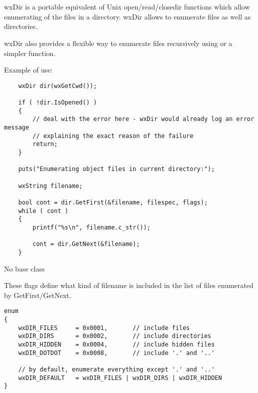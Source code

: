 
\section{}\label{wxdir}

wxDir is a portable equivalent of Unix {open/read/close}dir functions which
allow enumerating of the files in a directory. wxDir allows to enumerate files
as well as directories.

wxDir also provides a flexible way to enumerate files recursively using 
 or a simpler 
 function.

Example of use:

\begin{verbatim}
    wxDir dir(wxGetCwd());

    if ( !dir.IsOpened() )
    {
        // deal with the error here - wxDir would already log an error message
        // explaining the exact reason of the failure
        return;
    }

    puts("Enumerating object files in current directory:");

    wxString filename;

    bool cont = dir.GetFirst(&filename, filespec, flags);
    while ( cont )
    {
        printf("%s\n", filename.c_str());

        cont = dir.GetNext(&filename);
    }
\end{verbatim}


No base class


These flags define what kind of filename is included in the list of files
enumerated by GetFirst/GetNext.

{\small
\begin{verbatim}
enum
{
    wxDIR_FILES     = 0x0001,       // include files
    wxDIR_DIRS      = 0x0002,       // include directories
    wxDIR_HIDDEN    = 0x0004,       // include hidden files
    wxDIR_DOTDOT    = 0x0008,       // include '.' and '..'

    // by default, enumerate everything except '.' and '..'
    wxDIR_DEFAULT   = wxDIR_FILES | wxDIR_DIRS | wxDIR_HIDDEN
}
\end{verbatim}
}

